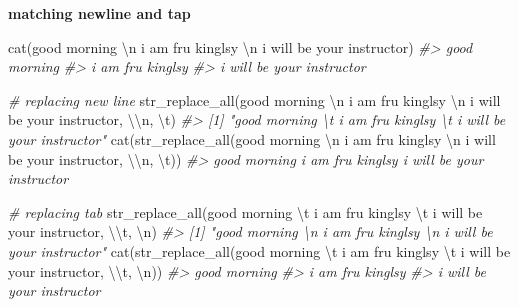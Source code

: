 \documentclass[
]{book}
\newenvironment{Shaded}{\begin{snugshade}}{\end{snugshade}}
\newcommand{\CommentTok}[1]{\textcolor[rgb]{0.56,0.35,0.01}{\textit{#1}}}
\newcommand{\FunctionTok}[1]{\textcolor[rgb]{0.00,0.00,0.00}{#1}}
\newcommand{\NormalTok}[1]{#1}
\newcommand{\SpecialCharTok}[1]{\textcolor[rgb]{0.00,0.00,0.00}{#1}}
\newcommand{\StringTok}[1]{\textcolor[rgb]{0.31,0.60,0.02}{#1}}
\begin{document}
\textbf{matching newline and tap}

\begin{Shaded}
\begin{Highlighting}[]
\FunctionTok{cat}\NormalTok{(}\StringTok{\textquotesingle{}good morning }\SpecialCharTok{\textbackslash{}n}\StringTok{ i am fru kinglsy }\SpecialCharTok{\textbackslash{}n}\StringTok{ i will be your instructor\textquotesingle{}}\NormalTok{)}
\CommentTok{\#\textgreater{} good morning }
\CommentTok{\#\textgreater{}  i am fru kinglsy }
\CommentTok{\#\textgreater{}  i will be your instructor}

\CommentTok{\# replacing new line}
\FunctionTok{str\_replace\_all}\NormalTok{(}\StringTok{\textquotesingle{}good morning }\SpecialCharTok{\textbackslash{}n}\StringTok{ i am fru kinglsy }\SpecialCharTok{\textbackslash{}n}\StringTok{ i will be your instructor\textquotesingle{}}\NormalTok{, }\StringTok{\textquotesingle{}}\SpecialCharTok{\textbackslash{}\textbackslash{}}\StringTok{n\textquotesingle{}}\NormalTok{, }\StringTok{\textquotesingle{}}\SpecialCharTok{\textbackslash{}t}\StringTok{\textquotesingle{}}\NormalTok{)}
\CommentTok{\#\textgreater{} [1] "good morning \textbackslash{}t i am fru kinglsy \textbackslash{}t i will be your instructor"}
\FunctionTok{cat}\NormalTok{(}\FunctionTok{str\_replace\_all}\NormalTok{(}\StringTok{\textquotesingle{}good morning }\SpecialCharTok{\textbackslash{}n}\StringTok{ i am fru kinglsy }\SpecialCharTok{\textbackslash{}n}\StringTok{ i will be your instructor\textquotesingle{}}\NormalTok{, }\StringTok{\textquotesingle{}}\SpecialCharTok{\textbackslash{}\textbackslash{}}\StringTok{n\textquotesingle{}}\NormalTok{, }\StringTok{\textquotesingle{}}\SpecialCharTok{\textbackslash{}t}\StringTok{\textquotesingle{}}\NormalTok{))}
\CommentTok{\#\textgreater{} good morning      i am fru kinglsy    i will be your instructor}

\CommentTok{\# replacing tab}
\FunctionTok{str\_replace\_all}\NormalTok{(}\StringTok{\textquotesingle{}good morning }\SpecialCharTok{\textbackslash{}t}\StringTok{ i am fru kinglsy }\SpecialCharTok{\textbackslash{}t}\StringTok{ i will be your instructor\textquotesingle{}}\NormalTok{, }\StringTok{\textquotesingle{}}\SpecialCharTok{\textbackslash{}\textbackslash{}}\StringTok{t\textquotesingle{}}\NormalTok{, }\StringTok{\textquotesingle{}}\SpecialCharTok{\textbackslash{}n}\StringTok{\textquotesingle{}}\NormalTok{)}
\CommentTok{\#\textgreater{} [1] "good morning \textbackslash{}n i am fru kinglsy \textbackslash{}n i will be your instructor"}
\FunctionTok{cat}\NormalTok{(}\FunctionTok{str\_replace\_all}\NormalTok{(}\StringTok{\textquotesingle{}good morning }\SpecialCharTok{\textbackslash{}t}\StringTok{ i am fru kinglsy }\SpecialCharTok{\textbackslash{}t}\StringTok{ i will be your instructor\textquotesingle{}}\NormalTok{, }\StringTok{\textquotesingle{}}\SpecialCharTok{\textbackslash{}\textbackslash{}}\StringTok{t\textquotesingle{}}\NormalTok{, }\StringTok{\textquotesingle{}}\SpecialCharTok{\textbackslash{}n}\StringTok{\textquotesingle{}}\NormalTok{))}
\CommentTok{\#\textgreater{} good morning }
\CommentTok{\#\textgreater{}  i am fru kinglsy }
\CommentTok{\#\textgreater{}  i will be your instructor}
\end{Highlighting}
\end{Shaded}
\end{document}
